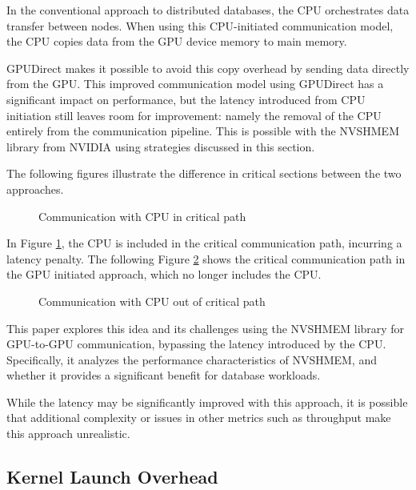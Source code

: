 In the conventional approach to distributed databases, the CPU orchestrates data transfer between nodes. When using this CPU-initiated communication model, the CPU copies data from the GPU device memory to main memory.

GPUDirect \cite{gilad2011} makes it possible to avoid this copy overhead by sending data directly from the GPU.
This improved communication model using GPUDirect has a significant impact on performance, but the latency introduced from CPU initiation still leaves room for improvement: namely the removal of the CPU entirely from the communication pipeline.
This is possible with the NVSHMEM library from NVIDIA using strategies discussed in this section.

The following figures illustrate the difference in critical sections between the two approaches.

\begin{figure}[h]
    \centering
    \captionsetup{justification=centering}
    
    \caption{Communication with CPU in critical path}
    \label{fig:cpu_in_crit}
\end{figure}

In Figure \ref{fig:cpu_in_crit}, the CPU is included in the critical communication path, incurring a latency penalty.
The following Figure \ref{fig:cpu_out_crit} shows the critical communication path in the GPU initiated approach, which no longer includes the CPU.

\begin{figure}[h]
    \centering
    \captionsetup{justification=centering}
    
    \caption{Communication with CPU out of critical path}
    \label{fig:cpu_out_crit}
\end{figure}

This paper explores this idea and its challenges using the NVSHMEM library for GPU-to-GPU communication, bypassing the latency introduced by the CPU.
Specifically, it analyzes the performance characteristics of NVSHMEM, and whether it provides a significant benefit for database workloads.

While the latency may be significantly improved with this approach, it is possible that additional complexity or issues in other metrics such as throughput make this approach unrealistic.

\clearpage

\subsection{Kernel Launch Overhead}

